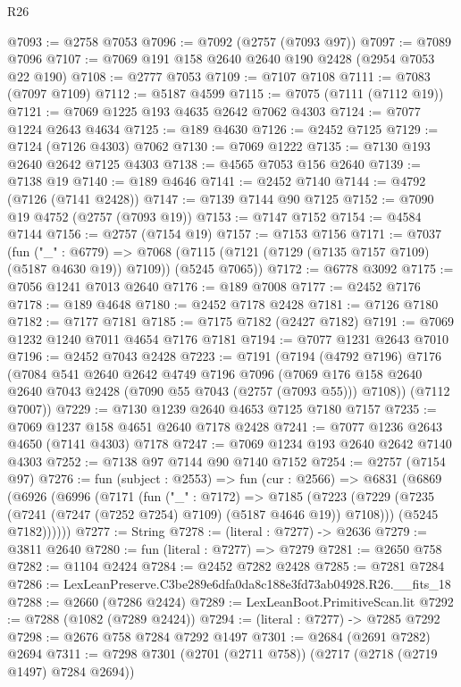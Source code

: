 \begin{lexlean}{R26}
\begin{coremodule}
@7093 := @2758 @7053
@7096 := @7092 (@2757 (@7093 @97))
@7097 := @7089 @7096
@7107 := @7069 @191 @158 @2640 @2640 @190 @2428 (@2954 @7053 @22 @190)
@7108 := @2777 @7053
@7109 := @7107 @7108
@7111 := @7083 (@7097 @7109)
@7112 := @5187 @4599
@7115 := @7075 (@7111 (@7112 @19))
@7121 := @7069 @1225 @193 @4635 @2642 @7062 @4303
@7124 := @7077 @1224 @2643 @4634
@7125 := @189 @4630
@7126 := @2452 @7125
@7129 := @7124 (@7126 @4303) @7062
@7130 := @7069 @1222
@7135 := @7130 @193 @2640 @2642 @7125 @4303
@7138 := @4565 @7053 @156 @2640
@7139 := @7138 @19
@7140 := @189 @4646
@7141 := @2452 @7140
@7144 := @4792 (@7126 (@7141 @2428))
@7147 := @7139 @7144 @90 @7125
@7152 := @7090 @19 @4752 (@2757 (@7093 @19))
@7153 := @7147 @7152
@7154 := @4584 @7144
@7156 := @2757 (@7154 @19)
@7157 := @7153 @7156
@7171 := @7037
    (fun ("_" : @6779) =>
    @7068 (@7115 (@7121 (@7129 (@7135 @7157 @7109) (@5187 @4630 @19)) @7109)) (@5245 @7065))
@7172 := @6778 @3092
@7175 := @7056 @1241 @7013 @2640
@7176 := @189 @7008
@7177 := @2452 @7176
@7178 := @189 @4648
@7180 := @2452 @7178 @2428
@7181 := @7126 @7180
@7182 := @7177 @7181
@7185 := @7175 @7182 (@2427 @7182)
@7191 := @7069 @1232 @1240 @7011 @4654 @7176 @7181
@7194 := @7077 @1231 @2643 @7010
@7196 := @2452 @7043 @2428
@7223 := @7191
    (@7194
      (@4792 @7196)
      @7176
      (@7084
        @541
        @2640
        @2642
        @4749
        @7196
        @7096
        (@7069 @176 @158 @2640 @2640 @7043 @2428 (@7090 @55 @7043 (@2757 (@7093 @55))) @7108))
      (@7112 @7007))
@7229 := @7130 @1239 @2640 @4653 @7125 @7180 @7157
@7235 := @7069 @1237 @158 @4651 @2640 @7178 @2428
@7241 := @7077 @1236 @2643 @4650 (@7141 @4303) @7178
@7247 := @7069 @1234 @193 @2640 @2642 @7140 @4303
@7252 := @7138 @97 @7144 @90 @7140 @7152
@7254 := @2757 (@7154 @97)
@7276 := fun (subject : @2553) =>
  fun (cur : @2566) =>
  @6831
    (@6869
      (@6926
        (@6996
          (@7171
            (fun ("_" : @7172) =>
            @7185
              (@7223 (@7229 (@7235 (@7241 (@7247 (@7252 @7254) @7109) (@5187 @4646 @19)) @7108)))
              (@5245 @7182))))))
@7277 := String
@7278 := (literal : @7277) -> @2636
@7279 := @3811 @2640
@7280 := fun (literal : @7277) => @7279
@7281 := @2650 @758
@7282 := @1104 @2424
@7284 := @2452 @7282 @2428
@7285 := @7281 @7284
@7286 := LexLeanPreserve.C3be289e6dfa0da8c188e3fd73ab04928.R26.__fits_18
@7288 := @2660 (@7286 @2424)
@7289 := LexLeanBoot.PrimitiveScan.lit
@7292 := @7288 (@1082 (@7289 @2424))
@7294 := (literal : @7277) -> @7285 @7292
@7298 := @2676 @758 @7284 @7292 @1497
@7301 := @2684 (@2691 @7282) @2694
@7311 := @7298 @7301 (@2701 (@2711 @758)) (@2717 (@2718 (@2719 @1497) @7284 @2694))

\end{coremodule}
\end{lexlean}
